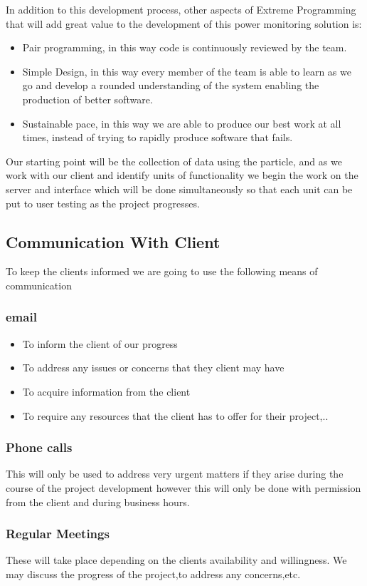 \documentclass[a4paper,12pt]{article}
\begin{document}
In addition to this development process, other aspects of Extreme Programming that will add great value to the development of this power monitoring solution is:
\begin{itemize}
\item Pair programming, in this way code is continuously reviewed by the team.
\item Simple Design, in this way every member of the team is able to learn as we go and develop a rounded understanding of the system enabling the production of better software.
\item Sustainable pace, in this way we are able to produce our best work at all times, instead of trying to rapidly produce software that fails.
\end{itemize}
Our starting point will be the collection of data using the particle, and as we work with our client and identify units of functionality we begin the work on the server and interface which will be done simultaneously so that each unit can be put to user testing as the project progresses.
\subsection{Communication With Client}
To keep the clients informed we are going to use the following means of communication
\subsubsection{email}
\begin{itemize}
\item To inform the client of our progress
\item To address any issues or concerns that they client may have
\item To acquire information from the client
\item To require any resources that the client has to offer for their project,..
\end{itemize}

\subsubsection{Phone calls}
 This will only be used to address very urgent matters if they arise during the course of the project development 
 however this will only be done with permission from the client and during business hours.
 
\subsubsection{Regular Meetings}	 
These will take place depending on the clients availability and willingness.
We may discuss the progress of the project,to address any concerns,etc.
\end{document}
